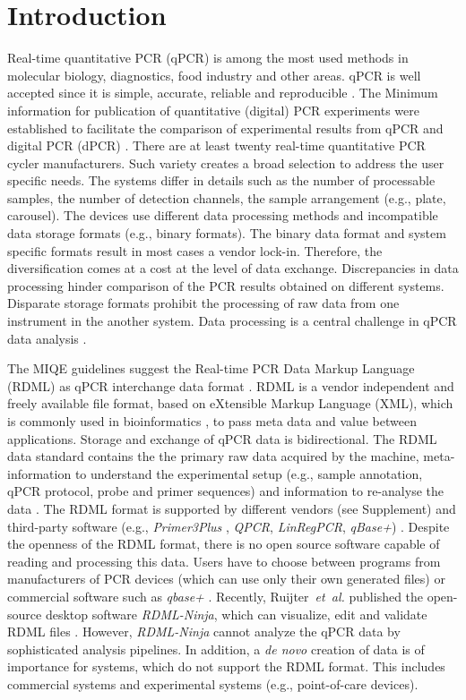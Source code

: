 \documentclass{bioinfo}
\begin{document}
\section{Introduction}
  Real-time quantitative PCR (qPCR) is among the most used methods in molecular 
biology, diagnostics, food industry and other areas. qPCR is well accepted since 
it is simple, accurate, reliable and reproducible \cite{pabinger_2014}. The 
Minimum information for publication of quantitative (digital) PCR experiments  
were established to facilitate the comparison of experimental results from qPCR 
and digital PCR (dPCR) \cite{huggett_2013}. There are at least twenty real-time 
quantitative PCR cycler manufacturers. Such variety creates a broad selection to 
address the user specific needs. The systems differ in details such as the 
number of processable samples, the number of detection channels, the sample 
arrangement (e.g., plate, carousel). The devices use different data processing 
methods and incompatible data storage formats (e.g.,  binary formats). The 
binary data format and system specific formats result in most cases a vendor 
lock-in. Therefore, the diversification comes at a cost at the level of data 
exchange. Discrepancies in data processing hinder comparison of the PCR results 
obtained on different systems. Disparate storage formats prohibit the processing 
of raw data from one instrument in the another system. Data processing is a 
central challenge in qPCR data analysis \cite{roediger2015r, 
spiess_impact_2014}.

The MIQE guidelines suggest the Real-time PCR Data Markup Language (RDML) as 
qPCR interchange data format \cite{rdml-ninja_2015}. RDML is a vendor 
independent and freely available file format, based on eXtensible Markup 
Language (XML), which is commonly used in bioinformatics \cite{achard_xml_2001}, 
to pass meta data and value between applications. Storage and exchange of qPCR 
data is bidirectional. The RDML data standard contains the the primary raw data 
acquired by the machine, meta-information to understand the experimental setup 
(e.g., sample annotation, qPCR protocol, probe and primer sequences) and 
information to re-analyse the data \cite{lefever_rdml_2009}. The RDML format is 
supported by different vendors (see Supplement) and third-party software (e.g., 
\textit{Primer3Plus} \cite{untergasser_2007}, \textit{QPCR}, \textit{LinRegPCR}, 
\textit{qBase+}) \cite{pabinger_2014, rdml-ninja_2015}. Despite the openness of 
the RDML format, there is no open source software capable of reading and 
processing this data. Users have to choose between programs from manufacturers 
of PCR devices (which can use only their own generated files) or commercial 
software such as \textit{qbase+} \cite{pabinger_2014, rdml-ninja_2015}. 
Recently, Ruijter~\textit{et~al.} published the open-source desktop software 
\textit{RDML-Ninja}, which can visualize, edit and validate RDML files 
\cite{rdml-ninja_2015}. However, \textit{RDML-Ninja} cannot analyze the qPCR 
data by sophisticated analysis pipelines. In addition, a \textit{de novo} 
creation of data is of importance for systems, which do not support the RDML 
format. This includes commercial systems and experimental systems (e.g.,  
point-of-care devices). 
\end{document}
